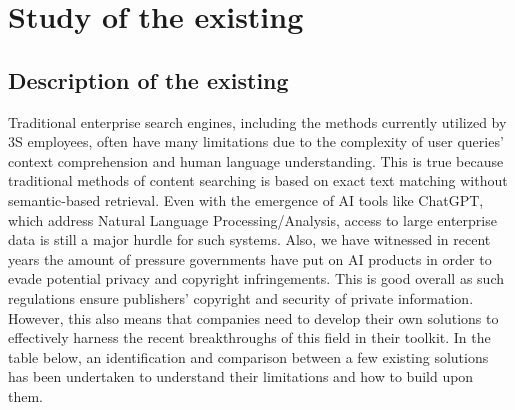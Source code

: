 \section{Study of the existing}
\subsection{Description of the existing}
Traditional enterprise search engines, including the methods currently utilized by 3S employees, often have many limitations due to the complexity of user queries' context comprehension and human language understanding. This is true because traditional methods of content searching is based on exact text matching without semantic-based retrieval. Even with the emergence of AI tools like ChatGPT, which address Natural Language Processing/Analysis, access to large enterprise data is still a major hurdle for such systems. Also, we have witnessed in recent years the amount of pressure governments have put on AI products in order to evade potential privacy and copyright infringements. This is good overall as such regulations ensure publishers' copyright and security of private information. However, this also means that companies need to develop their own solutions to effectively harness the recent breakthroughs of this field in their toolkit.\medskip\newline
In the table below, an identification and comparison between a few existing solutions has been undertaken to understand their limitations and how to build upon them.
